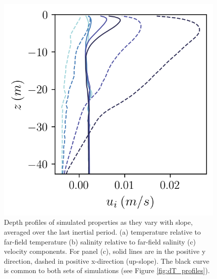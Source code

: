 \documentclass[draft]{agujournal2019}
\begin{document}
\begin{figure}[h!]
\begin{minipage}{0.33\textwidth}
    \end{minipage}%
    \begin{minipage}{0.33\textwidth}
        \includegraphics[trim={0 0cm 0 0},clip, width=\textwidth]{Figures/velocity_cmp_dslope_43h_tav13h_z_profile.png}
    \end{minipage}
    \caption{Depth profiles of simulated properties as they vary with slope, averaged over the last inertial period. (a) temperature relative to far-field temperature (b) salinity relative to far-field salinity (c) velocity components. For panel (c), solid lines are in the positive y direction, dashed in positive x-direction (up-slope). The black curve is common to both sets of simulations (see Figure \ref{fig:dT_profiles}).}
    \label{fig:dslope_profiles}
\end{figure}
\end{document}
